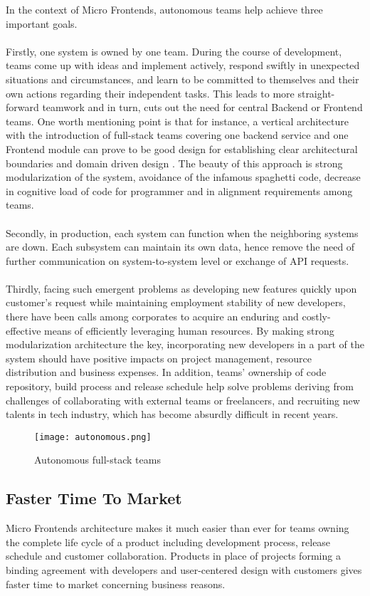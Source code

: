 \documentclass[a4paper]{book}
\begin{document}
In the context of Micro Frontends, autonomous teams help achieve three important goals.
\\ \\
Firstly, one system is owned by one team. During the course of development, teams come up with ideas and implement actively, respond swiftly in unexpected situations and circumstances, and learn to be committed to themselves and their own actions regarding their independent tasks. This leads to more straight-forward teamwork and in turn, cuts out the need for central Backend or Frontend teams. One worth mentioning point is that for instance, a vertical architecture with the introduction of full-stack teams covering one backend service and one Frontend module can prove to be good design for establishing clear architectural boundaries and domain driven design \cite{DDD}. The beauty of this approach is strong modularization of the system, avoidance of the infamous spaghetti code, decrease in cognitive load of code for programmer and in alignment requirements among teams.
\\ \\
Secondly, in production, each system can function when the neighboring systems are down. Each subsystem can maintain its own data, hence remove the need of further communication on system-to-system level or exchange of API requests.
\\ \\
Thirdly, facing such emergent problems as developing new features quickly upon customer’s request while maintaining employment stability of new developers, there have been calls among corporates to acquire an enduring and costly-effective means of efficiently leveraging human resources. By making strong modularization architecture the key, incorporating new developers in a part of the system should have positive impacts on project management, resource distribution and business expenses. In addition, teams’ ownership of code repository, build process and release schedule help solve problems deriving from challenges of collaborating with external teams or freelancers, and recruiting new talents in tech industry, which has become absurdly difficult in recent years.
\clearpage
\begin{figure}
    \centering
    \texttt{[image: autonomous.png]}
    \caption{Autonomous full-stack teams \cite{Gee20}}
    \label{fig:my_label}
\end{figure}
\subsection{Faster Time To Market}
Micro Frontends architecture makes it much easier than ever for teams owning the complete life cycle of a product including development process, release schedule and customer collaboration. Products in place of projects forming a binding agreement with developers and user-centered design with customers gives faster time to market concerning business reasons. \cite{Rap20}
\end{document}
